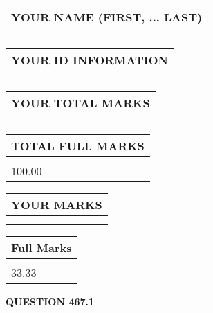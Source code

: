 \documentclass{ctexart}
\begin{document}
   
   
   
\newpage 
\setcounter{page}{ 
   467001 } 
   
   
   
   
\noindent\begin{tabular}{|l|}
\hline
YOUR NAME (FIRST, ... LAST)  \\
\hline
 \\ 
 \\ 
\hline
\end{tabular}
\hspace{0.05in} \begin{tabular}{|l|}
\hline
 YOUR   ID   INFORMATION  \\
\hline
 \\ 
 \\ 
\hline
\end{tabular}
   
   
\vspace{0.2in}\noindent\begin{tabular}{|l|}
\hline
YOUR TOTAL MARKS  \\
\hline
 \\ 
 \\ 
\hline
\end{tabular}
\hspace{0.05in} \begin{tabular}{|l|}
\hline
TOTAL FULL MARKS  \\
\hline
 \\ 
100.00 \\
\hline
\end{tabular}
   
   
 \vspace{0.2in}
 
 
 
 
   
   
  
\vspace{0.2in}
  
\noindent\begin{tabular}{|l|}
\hline
 YOUR MARKS  \\
\hline
 \\ 
 \\ 
\hline
\end{tabular}
\hspace{0.05in} \begin{tabular}{|l|}
\hline
 Full Marks  \\
\hline
 \\ 
33.33 \\
\hline
\end{tabular}
{\textbf{\Large{QUESTION
467.1 
}}}
  
\end{document}
